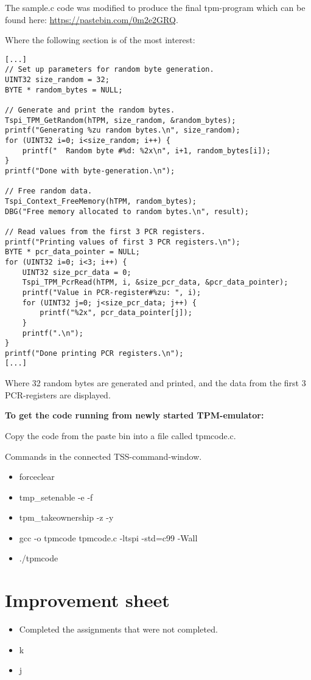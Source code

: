 \documentclass[10pt]{article}
\begin{document}
The sample.c code was modified to produce the final tpm-program which can be
found here: \url{https://pastebin.com/0m2e2GRQ}.

Where the following section is of the most interest:

\begin{lstlisting}
[...]
// Set up parameters for random byte generation.
UINT32 size_random = 32;
BYTE * random_bytes = NULL;

// Generate and print the random bytes.
Tspi_TPM_GetRandom(hTPM, size_random, &random_bytes);
printf("Generating %zu random bytes.\n", size_random);
for (UINT32 i=0; i<size_random; i++) {
    printf("  Random byte #%d: %2x\n", i+1, random_bytes[i]);
}
printf("Done with byte-generation.\n");

// Free random data.
Tspi_Context_FreeMemory(hTPM, random_bytes);
DBG("Free memory allocated to random bytes.\n", result);

// Read values from the first 3 PCR registers.
printf("Printing values of first 3 PCR registers.\n");
BYTE * pcr_data_pointer = NULL;
for (UINT32 i=0; i<3; i++) {
    UINT32 size_pcr_data = 0;
    Tspi_TPM_PcrRead(hTPM, i, &size_pcr_data, &pcr_data_pointer);
    printf("Value in PCR-register#%zu: ", i);
    for (UINT32 j=0; j<size_pcr_data; j++) {
        printf("%2x", pcr_data_pointer[j]);
    }
    printf(".\n");
}
printf("Done printing PCR registers.\n");
[...]
\end{lstlisting}

Where 32 random bytes are generated and printed, and the data from the first 3 PCR-registers
are displayed.

\textbf{To get the code running from newly started TPM-emulator:}

Copy the code from the paste bin into a file called tpmcode.c.

Commands in the connected TSS-command-window.
\begin{itemize}
  \item{forceclear}
  \item{tmp\_setenable -e -f}
  \item{tpm\_takeownership -z -y}
  \item{gcc -o tpmcode tpmcode.c -ltspi -std=c99 -Wall}
  \item{./tpmcode}
\end{itemize}

\section{Improvement sheet}
\begin{itemize}
    \item {Completed the assignments that were not completed.}
    \item {k}
    \item {j}
\end{itemize}
\end{document}
